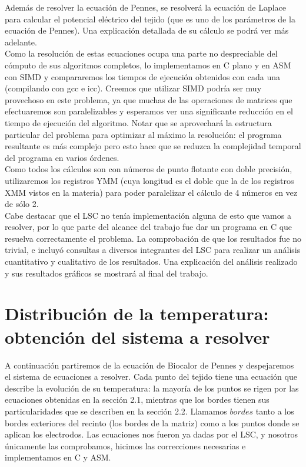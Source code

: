 \documentclass[a4paper]{article}
\begin{document}
Además de resolver la ecuación de Pennes, se resolverá la ecuación
de Laplace para calcular el potencial eléctrico del tejido (que es uno de los parámetros
de la ecuación de Pennes). Una explicación detallada de su cálculo se podrá ver más adelante.\\

Como la resolución de estas ecuaciones ocupa una parte no despreciable 
del cómputo de sus algoritmos completos, lo implementamos en C plano y en ASM con SIMD y 
compararemos los tiempos de ejecución obtenidos con cada una (compilando con gcc e icc). Creemos que 
utilizar SIMD podría ser muy provechoso en este problema, ya que muchas 
de las operaciones de matrices que efectuaremos son paralelizables y 
esperamos ver una significante reducción en el tiempo de ejecución del 
algoritmo. Notar que se aprovechará la estructura particular del problema para optimizar al máximo la
resolución: el programa resultante es más complejo pero esto hace que se reduzca la complejidad
temporal del programa en varios órdenes.\\

Como todos los cálculos son con números de punto flotante con doble 
precisión, utilizaremos los registros YMM (cuya longitud es el doble que la de los
registros XMM vistos en la materia) para poder paralelizar el cálculo de 4 números en vez de sólo 2.\\

Cabe destacar que el LSC no tenía implementación alguna de esto que vamos
a resolver, por lo que parte del alcance del trabajo fue dar un programa
en C que resuelva correctamente el problema. La comprobación de que los resultados 
fue no trivial, e incluyó consultas a diversos integrantes del LSC para
realizar un análisis cuantitativo y cualitativo de los resultados. Una explicación del
análisis realizado y sus resultados gráficos se mostrará al final del trabajo.

\newpage
\section{Distribuci\'on de la temperatura: obtención del sistema a resolver}

A continuación partiremos de la ecuación de Biocalor de Pennes y despejaremos
el sistema de ecuaciones a resolver. Cada punto del tejido tiene una 
ecuación que describe la evolución de su temperatura: la mayoría de los puntos
se rigen por las ecuaciones obtenidas en la sección 2.1, mientras que los bordes
tienen sus particularidades que se describen en la sección 2.2. 
Llamamos $bordes$ tanto a los bordes exteriores del recinto
(los bordes de la matriz) como a los puntos donde se aplican los electrodos.
Las ecuaciones nos fueron ya dadas por el LSC, y nosotros únicamente las 
comprobamos, hicimos las correcciones necesarias e implementamos en C y ASM.
\end{document}
